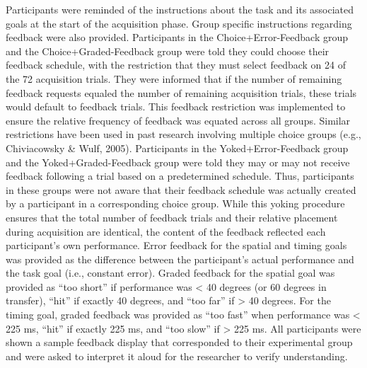 \documentclass[
  doc, donotrepeattitle,floatsintext]{apa7}
\begin{document}
Participants were reminded of the instructions about the task and its associated goals at the start of the acquisition phase. Group specific instructions regarding feedback were also provided. Participants in the Choice+Error-Feedback group and the Choice+Graded-Feedback group were told they could choose their feedback schedule, with the restriction that they must select feedback on 24 of the 72 acquisition trials. They were informed that if the number of remaining feedback requests equaled the number of remaining acquisition trials, these trials would default to feedback trials. This feedback restriction was implemented to ensure the relative frequency of feedback was equated across all groups. Similar restrictions have been used in past research involving multiple choice groups (e.g., Chiviacowsky \& Wulf, 2005). Participants in the Yoked+Error-Feedback group and the Yoked+Graded-Feedback group were told they may or may not receive feedback following a trial based on a predetermined schedule. Thus, participants in these groups were not aware that their feedback schedule was actually created by a participant in a corresponding choice group. While this yoking procedure ensures that the total number of feedback trials and their relative placement during acquisition are identical, the content of the feedback reflected each participant's own performance. Error feedback for the spatial and timing goals was provided as the difference between the participant's actual performance and the task goal (i.e., constant error). Graded feedback for the spatial goal was provided as ``too short'' if performance was \textless{} 40 degrees (or 60 degrees in transfer), ``hit'' if exactly 40 degrees, and ``too far'' if \textgreater{} 40 degrees. For the timing goal, graded feedback was provided as ``too fast'' when performance was \textless{} 225 ms, ``hit'' if exactly 225 ms, and ``too slow'' if \textgreater{} 225 ms. All participants were shown a sample feedback display that corresponded to their experimental group and were asked to interpret it aloud for the researcher to verify understanding.
\end{document}
